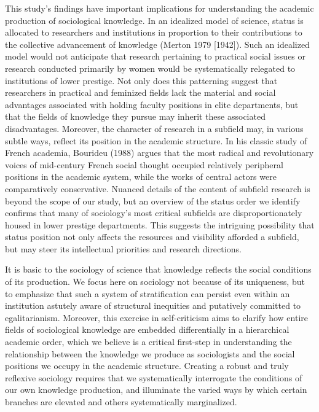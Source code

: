 \documentclass{article}
\begin{document}
This study's findings have important implications for understanding the
academic production of sociological knowledge. In an idealized model of
science, status is allocated to researchers and institutions in
proportion to their contributions to the collective advancement of
knowledge (Merton 1979 {[}1942{]}). Such an idealized model would not
anticipate that research pertaining to practical social issues or
research conducted primarily by women would be systematically relegated
to institutions of lower prestige. Not only does this patterning suggest
that researchers in practical and feminized fields lack the material and
social advantages associated with holding faculty positions in elite
departments, but that the fields of knowledge they pursue may inherit
these associated disadvantages. Moreover, the character of research in a
subfield may, in various subtle ways, reflect its position in the
academic structure. In his classic study of French academia, Bourideu
(1988) argues that the most radical and revolutionary voices of
mid-century French social thought occupied relatively peripheral
positions in the academic system, while the works of central actors were
comparatively conservative. Nuanced details of the content of subfield
research is beyond the scope of our study, but an overview of the status
order we identify confirms that many of sociology's most critical
subfields are disproportionately housed in lower prestige departments.
This suggests the intriguing possibility that status position not only
affects the resources and visibility afforded a subfield, but may steer
its intellectual priorities and research directions.

It is basic to the sociology of science that knowledge reflects the
social conditions of its production. We focus here on sociology not
because of its uniqueness, but to emphasize that such a system of
stratification can persist even within an institution astutely aware of
structural inequities and putatively committed to egalitarianism.
Moreover, this exercise in self-criticism aims to clarify how entire
fields of sociological knowledge are embedded differentially in a
hierarchical academic order, which we believe is a critical first-step
in understanding the relationship between the knowledge we produce as
sociologists and the social positions we occupy in the academic
structure. Creating a robust and truly reflexive sociology requires that
we systematically interrogate the conditions of our own knowledge
production, and illuminate the varied ways by which certain branches are
elevated and others systematically marginalized.
\end{document}
